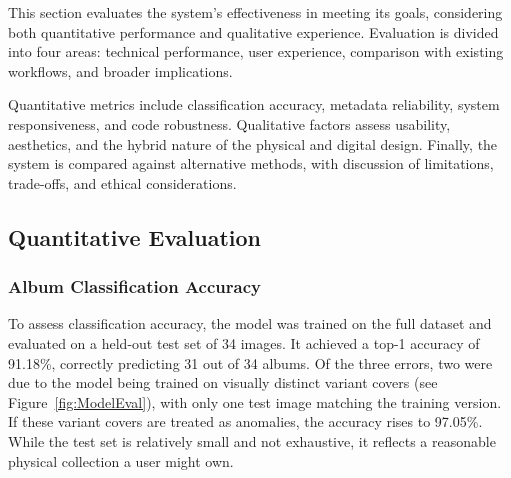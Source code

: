         This section evaluates the system’s effectiveness in meeting its goals, considering both quantitative performance and qualitative experience. Evaluation is divided into four areas: technical performance, user experience, comparison with existing workflows, and broader implications.
    
        Quantitative metrics include classification accuracy, metadata reliability, system responsiveness, and code robustness. Qualitative factors assess usability, aesthetics, and the hybrid nature of the physical and digital design. Finally, the system is compared against alternative methods, with discussion of limitations, trade-offs, and ethical considerations.
        
        \subsection{Quantitative Evaluation}
    
            \subsubsection{Album Classification Accuracy}
    
                To assess classification accuracy, the model was trained on the full dataset and evaluated on a held-out test set of 34 images. It achieved a top-1 accuracy of 91.18\%, correctly predicting 31 out of 34 albums. Of the three errors, two were due to the model being trained on visually distinct variant covers (see Figure~\ref{fig:ModelEval}), with only one test image matching the training version. If these variant covers are treated as anomalies, the accuracy rises to 97.05\%. While the test set is relatively small and not exhaustive, it reflects a reasonable physical collection a user might own.
    
